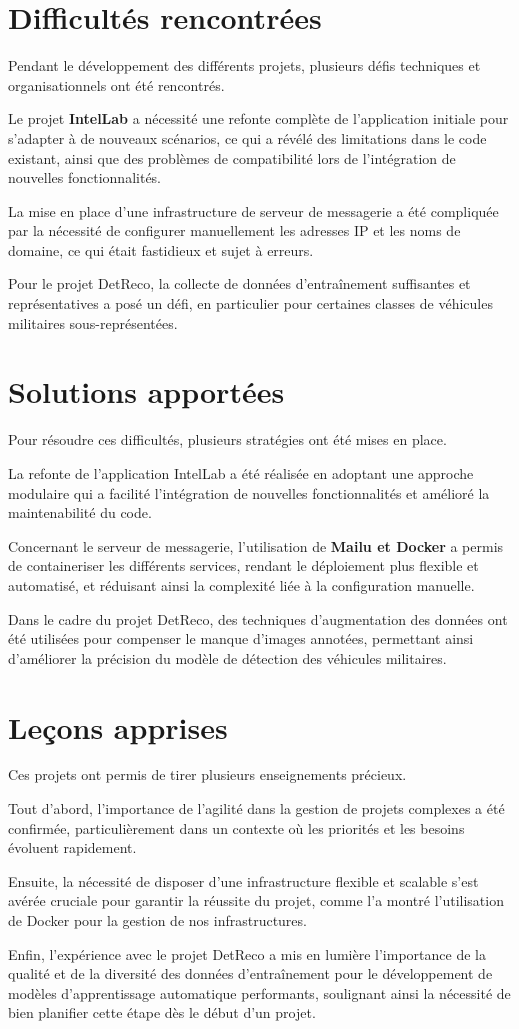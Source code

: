 
\section{Difficultés rencontrées}
Pendant le développement des différents projets, plusieurs défis techniques et organisationnels ont été rencontrés.

Le projet \textbf{IntelLab} a nécessité une refonte complète de l'application initiale pour s'adapter à de nouveaux scénarios, ce qui a révélé des limitations dans le code existant, ainsi que des problèmes de compatibilité lors de l'intégration de nouvelles fonctionnalités.

La mise en place d'une infrastructure de serveur de messagerie a été compliquée par la nécessité de configurer manuellement les adresses IP et les noms de domaine, ce qui était fastidieux et sujet à erreurs.

Pour le projet DetReco, la collecte de données d'entraînement suffisantes et représentatives a posé un défi, en particulier pour certaines classes de véhicules militaires sous-représentées.

\section{Solutions apportées}
Pour résoudre ces difficultés, plusieurs stratégies ont été mises en place.

La refonte de l'application IntelLab a été réalisée en adoptant une approche modulaire qui a facilité l'intégration de nouvelles fonctionnalités et amélioré la maintenabilité du code.

Concernant le serveur de messagerie, l'utilisation de \textbf{Mailu et Docker} a permis de containeriser les différents services, rendant le déploiement plus flexible et automatisé, et réduisant ainsi la complexité liée à la configuration manuelle.

Dans le cadre du projet DetReco, des techniques d'augmentation des données ont été utilisées pour compenser le manque d'images annotées, permettant ainsi d'améliorer la précision du modèle de détection des véhicules militaires.

\section{Leçons apprises}
Ces projets ont permis de tirer plusieurs enseignements précieux.

Tout d'abord, l'importance de l'agilité dans la gestion de projets complexes a été confirmée, particulièrement dans un contexte où les priorités et les besoins évoluent rapidement.

Ensuite, la nécessité de disposer d'une infrastructure flexible et scalable s'est avérée cruciale pour garantir la réussite du projet, comme l'a montré l'utilisation de Docker pour la gestion de nos infrastructures.

Enfin, l'expérience avec le projet DetReco a mis en lumière l'importance de la qualité et de la diversité des données d'entraînement pour le développement de modèles d'apprentissage automatique performants, soulignant ainsi la nécessité de bien planifier cette étape dès le début d'un projet.
